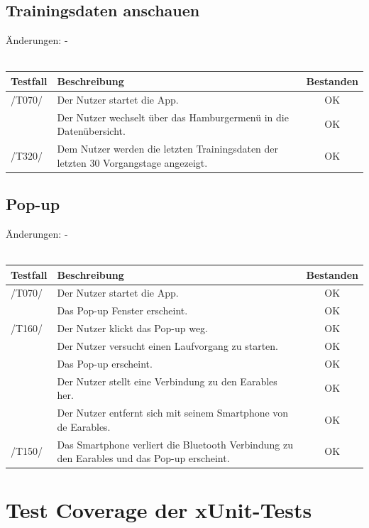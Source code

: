 \documentclass[a4paper,12pt]{article}
\newcommand{\testok}[0]{
	\cellcolor{green!25} OK
}
\begin{document}
\subsection{Trainingsdaten anschauen}
Änderungen: -
\\
\\
\begin{tabular}{ |p{1.5cm} | p{12cm} | c| }
	\hline
	\textbf{Testfall} & \textbf{Beschreibung} & \textbf{Bestanden}\\
	\hline
	/T070/ & Der Nutzer startet die App. & \testok \\
	\hline
	& Der Nutzer wechselt über das Hamburgermenü in die Datenübersicht. & \testok  \\
	\hline
	/T320/ & Dem Nutzer werden die letzten Trainingsdaten der letzten 30 Vorgangstage angezeigt. & \testok  \\
	\hline
\end{tabular}

\subsection{Pop-up}
Änderungen: -
\\
\\
\begin{tabular}{ |p{1.5cm} | p{12cm} | c| }
	\hline
	\textbf{Testfall} & \textbf{Beschreibung} & \textbf{Bestanden}\\
	\hline
	/T070/ & Der Nutzer startet die App. & \testok \\
	\hline
	& Das Pop-up Fenster erscheint. & \testok  \\
	\hline
	/T160/ & Der Nutzer klickt das Pop-up weg. & \testok  \\
	\hline
	& Der Nutzer versucht einen Laufvorgang zu starten. & \testok  \\
	\hline
	& Das Pop-up erscheint. & \testok  \\
	\hline
	& Der Nutzer stellt eine Verbindung zu den Earables her. & \testok  \\
	\hline
	& Der Nutzer entfernt sich mit seinem Smartphone von de Earables. & \testok  \\
	\hline
	/T150/ & Das Smartphone verliert die Bluetooth Verbindung zu den Earables und das Pop-up erscheint. & \testok  \\
	\hline
\end{tabular}



\section{Test Coverage der xUnit-Tests}
\end{document}
